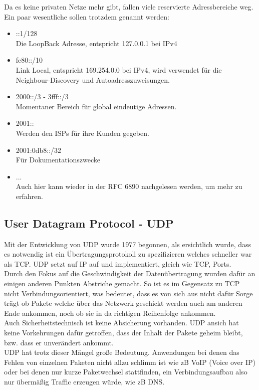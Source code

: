 \documentclass[11pt,a4paper]{report}
\begin{document}
Da es keine privaten Netze mehr gibt, fallen viele reservierte Adressbereiche weg. Ein paar wesentliche sollen trotzdem genannt werden:
\begin{itemize}
\item ::1/128\\
Die LoopBack Adresse, entspricht 127.0.0.1 bei IPv4
\item fe80::/10\\
Link Local, entspricht 169.254.0.0 bei IPv4, wird verwendet für die Neighbour-Discovery und Autoadresszuweisungen.
\item 2000::/3 - 3fff::/3\\
Momentaner Bereich für global eindeutige Adressen.
\item 2001::\\
Werden den ISPs für ihre Kunden gegeben.
\item 2001:0db8::/32\\
Für Dokumentationszwecke
\item ...\\
Auch hier kann wieder in der RFC 6890 nachgelesen werden, um mehr zu erfahren.
\end{itemize}
\subsection{User Datagram Protocol - UDP}
Mit der Entwicklung von UDP wurde 1977 begonnen, als ersichtlich wurde, dass es notwendig ist ein Übertragungsprotokoll zu spezifizieren welches schneller war als TCP. UDP setzt auf IP auf und implementiert, gleich wie TCP, Ports.\\

Durch den Fokus auf die Geschwindigkeit der Datenübertragung wurden dafür an einigen anderen Punkten Abstriche gemacht. So ist es im Gegensatz zu TCP nicht Verbindungsorientiert, was bedeutet, dass es von sich aus nicht dafür Sorge trägt ob Pakete welche über das Netzwerk geschickt werden auch am anderen Ende ankommen, noch ob sie in da richtigen Reihenfolge ankommen.\\
Auch Sicherheitstechnisch ist keine Absicherung vorhanden. UDP ansich hat keine Vorkehrungen dafür getroffen, dass der Inhalt der Pakete geheim bleibt, bzw. dass er unverändert ankommt.\\

UDP hat trotz dieser Mängel große Bedeutung. Anwendungen bei denen das Fehlen von einzelnen Paketen nicht allzu schlimm ist wie zB VoIP (Voice over IP) oder bei denen nur kurze Paketwechsel stattfinden, ein Verbindungsaufbau also nur übermäßig Traffic erzeugen würde, wie zB DNS.\\
\end{document}
